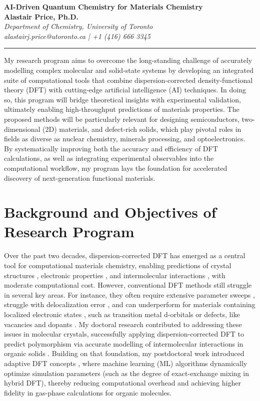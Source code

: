 \documentclass[11pt,letterpaper]{article}
\makeatletter
\newcommand{\customheader}{
    \begin{center}
        {\Large \textbf{AI-Driven Quantum Chemistry for Materials Chemistry}} \\ \vspace{2pt}
        {\large \textbf{Alastair Price, Ph.D.}} \\ 
        \vspace{1pt}
        \textit{Department of Chemistry, University of Toronto} \\
        \textit{alastairj.price@utoronto.ca \quad | \quad +1 (416) 666 3345}
    \end{center}
    \vspace{-10pt}
    \noindent\rule{\textwidth}{0.5pt} %
    \vspace{0.25pt}
}
\makeatother
\begin{document}
\customheader

My research program aims to overcome the long-standing challenge of accurately modelling complex molecular and solid-state systems by developing an integrated suite of computational tools that combine dispersion‐corrected density-functional theory (DFT) with cutting-edge artificial intelligence (AI) techniques. In doing so, this program will bridge theoretical insights with experimental validation, ultimately enabling high-throughput predictions of materials properties. The proposed methods will be particularly relevant for designing semiconductors, two-dimensional (2D) materials, and defect-rich solids, which play pivotal roles in fields as diverse as nuclear chemistry, minerals processing, and optoelectronics. By systematically improving both the accuracy and efficiency of DFT calculations, as well as integrating experimental observables into the computational workflow, my program lays the foundation for accelerated discovery of next-generation functional materials.

\section{Background and Objectives of Research Program}

Over the past two decades, dispersion-corrected DFT\cite{jcp-perspective,becke2014JCP,burke2012JCP} has emerged as a central tool for computational materials chemistry, enabling predictions of crystal structures \cite{moellmann2010importance, mayo2024assessment,BT7Rank}, electronic properties \cite{grimme2016dispersion}, and intermolecular interactions \cite{xdmaims}, with moderate computational cost. However, conventional DFT methods still struggle in several key areas. For instance, they often require extensive parameter sweeps \cite{gould2022poisoning,PhysRevX.15.011013,langreth1975exchange}, struggle with delocalization error \cite{wires}, and can underperform for materials containing localized electronic states \cite{yao2015efficient}, such as transition metal d-orbitals or defects, like vacancies and dopants \cite{sabino2022intrinsic}. My doctoral research contributed to addressing these issues in molecular crystals, successfully applying dispersion-corrected DFT to predict polymorphism via accurate modelling of intermolecular interactions in organic solids \cite{xdmaims,aimscsp}. Building on that foundation, my postdoctoral work introduced adaptive DFT concepts \cite{apbe0}, where machine learning (ML) algorithms dynamically optimize simulation parameters (such as the degree of exact-exchange mixing in hybrid DFT), thereby reducing computational overhead and achieving higher fidelity in gas-phase calculations for organic molecules.
\end{document}
